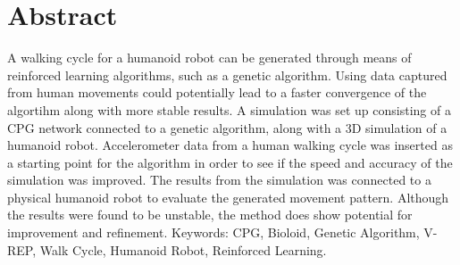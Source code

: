 \thispagestyle{plain}			%
\setlength{\parskip}{0pt plus 1.0pt}
\section*{Abstract}
A walking cycle for a humanoid robot can be generated through means of reinforced learning algorithms, such as a genetic algorithm. Using data captured from human movements could potentially lead to a faster convergence of the algortihm along with more stable results. A simulation was set up consisting of a CPG network connected to a genetic algorithm, along with a 3D simulation of a humanoid robot. Accelerometer data from a human walking cycle was inserted as a starting point for the algorithm in order to see if the speed and accuracy of the simulation was improved. The results from the simulation was connected to a physical humanoid robot to evaluate the generated movement pattern. Although the results were found to be unstable, the method does show potential for improvement and refinement.
\vfill
Keywords: CPG, Bioloid, Genetic Algorithm, V-REP, Walk Cycle, Humanoid Robot, Reinforced Learning.
\newpage				%
\thispagestyle{empty}
\mbox{}